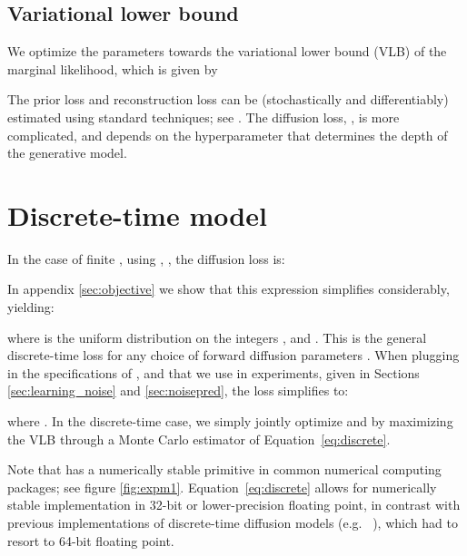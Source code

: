 \documentclass{article}
\def\Eqref#1{Equation~\ref{#1}}
\begin{document}
\subsection{Variational lower bound}
We optimize the parameters towards the variational lower bound (VLB) of the marginal likelihood, which is given by

The prior loss and reconstruction loss can be (stochastically and differentiably) estimated using standard techniques; see \citep{kingma2013auto}. The diffusion loss, , is more complicated, and depends on the hyperparameter  that determines the depth of the generative model. 





\section{Discrete-time model}

In the case of finite , using , , the diffusion loss is:

In appendix \ref{sec:objective} we show that this expression simplifies considerably, yielding:

where  is the uniform distribution on the integers , and . This is the general discrete-time loss for any choice of forward diffusion parameters .  When plugging in the specifications of ,  and  that we use in experiments, given in Sections \ref{sec:learning_noise} and \ref{sec:noisepred}, the loss simplifies to:

where . 
In the discrete-time case, we simply jointly optimize  and  by maximizing the VLB through a Monte Carlo estimator of \Eqref{eq:discrete}.

Note that  has a numerically stable primitive  in common numerical computing packages; see figure \ref{fig:expm1}. \Eqref{eq:discrete} allows for numerically stable implementation in 32-bit or lower-precision floating point, in contrast with previous implementations of discrete-time diffusion models (e.g. ~\citep{ho2020denoising}), which had to resort to 64-bit floating point. 
\end{document}
